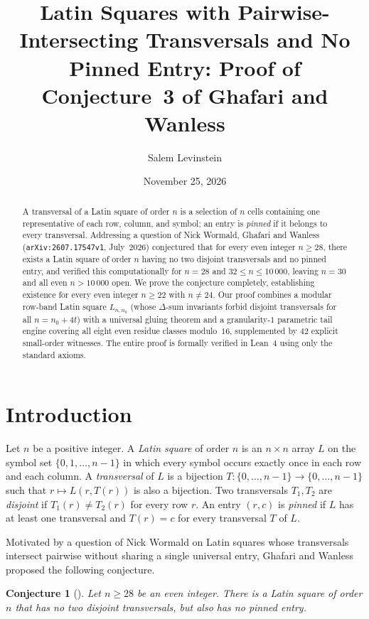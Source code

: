 \documentclass[11pt]{article}
\title{Latin Squares with Pairwise-Intersecting Transversals and No Pinned Entry: Proof of Conjecture~3 of Ghafari and Wanless}
\author{Salem Levinstein}
\date{November 25, 2026}
\newtheorem{conjecture}{Conjecture}
\begin{document}
\maketitle

\begin{abstract}
A transversal of a Latin square of order $n$ is a selection of $n$ cells containing one representative of each row, column, and symbol; an entry is \emph{pinned} if it belongs to every transversal. Addressing a question of Nick Wormald, Ghafari and Wanless (\texttt{arXiv:2607.17547v1}, July~2026) conjectured that for every even integer $n \ge 28$, there exists a Latin square of order $n$ having no two disjoint transversals and no pinned entry, and verified this computationally for $n = 28$ and $32 \le n \le 10\,000$, leaving $n = 30$ and all even $n > 10\,000$ open. We prove the conjecture completely, establishing existence for every even integer $n \ge 22$ with $n \ne 24$. Our proof combines a modular row-band Latin square $L_{n, n_0}$ (whose $\Delta$-sum invariants forbid disjoint transversals for all $n = n_0 + 4t$) with a universal gluing theorem and a granularity-$1$ parametric tail engine covering all eight even residue classes modulo~$16$, supplemented by $42$ explicit small-order witnesses. The entire proof is formally verified in Lean~4 using only the standard axioms.
\end{abstract}

\section{Introduction}

Let $n$ be a positive integer. A \emph{Latin square} of order $n$ is an $n \times n$ array $L$ on the symbol set $\{0, 1, \dots, n-1\}$ in which every symbol occurs exactly once in each row and each column. A \emph{transversal} of $L$ is a bijection $T : \{0,\dots,n-1\} \to \{0,\dots,n-1\}$ such that $r \mapsto L(r, T(r))$ is also a bijection. Two transversals $T_1, T_2$ are \emph{disjoint} if $T_1(r) \ne T_2(r)$ for every row $r$. An entry $(r, c)$ is \emph{pinned} if $L$ has at least one transversal and $T(r) = c$ for every transversal $T$ of $L$.

Motivated by a question of Nick Wormald on Latin squares whose transversals intersect pairwise without sharing a single universal entry, Ghafari and Wanless~\cite{ghafariwanless2026} proposed the following conjecture.

\begin{conjecture}[{\cite[Conjecture~3]{ghafariwanless2026}}]
Let $n \ge 28$ be an even integer. There is a Latin square of order $n$ that has no two disjoint transversals, but also has no pinned entry.
\end{conjecture}
\end{document}
